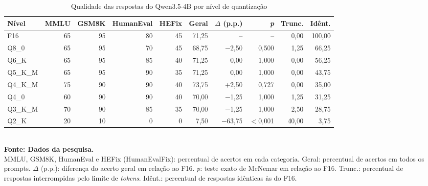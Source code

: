 \begin{table}[htb]
\centering
\caption{Qualidade das respostas do Qwen3.5-4B por nível de quantização}
\label{tab:qualidade-Qwen3.5-4B}
\small
\begin{tabular}{lrrrrrrrrr}
\hline
\textbf{Nível} & \textbf{MMLU} & \textbf{GSM8K} & \textbf{HumanEval} & \textbf{HEFix} & \textbf{Geral} & \textbf{$\Delta$ (p.p.)} & \textbf{\textit{p}} & \textbf{Trunc.} & \textbf{Idênt.} \\
\hline
F16 & 65 & 95 & 80 & 45 & 71,25 & -- & -- & 0,00 & 100,00 \\
Q8\_0 & 65 & 95 & 70 & 45 & 68,75 & $-$2,50 & 0,500 & 1,25 & 66,25 \\
Q6\_K & 65 & 95 & 85 & 40 & 71,25 & 0,00 & 1,000 & 0,00 & 56,25 \\
Q5\_K\_M & 65 & 95 & 90 & 35 & 71,25 & 0,00 & 1,000 & 0,00 & 43,75 \\
Q4\_K\_M & 75 & 90 & 90 & 40 & 73,75 & +2,50 & 0,727 & 0,00 & 35,00 \\
Q4\_0 & 60 & 90 & 90 & 40 & 70,00 & $-$1,25 & 1,000 & 1,25 & 31,25 \\
Q3\_K\_M & 70 & 90 & 85 & 35 & 70,00 & $-$1,25 & 1,000 & 2,50 & 28,75 \\
Q2\_K & 20 & 10 & 0 & 0 & 7,50 & $-$63,75 & $<$0,001 & 40,00 & 3,75 \\
\hline
\end{tabular}
\\[2pt]{\footnotesize \textbf{Fonte: Dados da pesquisa.}}
\\[2pt]{\footnotesize MMLU, GSM8K, HumanEval e HEFix (HumanEvalFix): percentual de acertos em cada categoria. Geral: percentual de acertos em todos os prompts. $\Delta$ (p.p.): diferença do acerto geral em relação ao F16. \textit{p}: teste exato de McNemar em relação ao F16. Trunc.: percentual de respostas interrompidas pelo limite de \textit{tokens}. Idênt.: percentual de respostas idênticas às do F16.}
\end{table}

